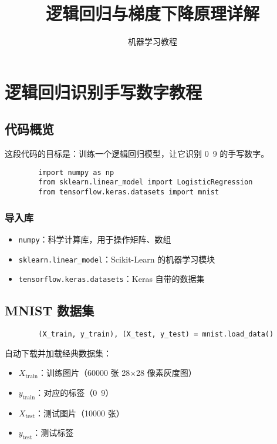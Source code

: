 \documentclass[UTF8]{ctexart}
\title{逻辑回归与梯度下降原理详解}
\author{机器学习教程}
\date{}
\begin{document}
	
	\maketitle
	
	\tableofcontents
	
	\section{逻辑回归识别手写数字教程}
	
	\subsection{代码概览}
	这段代码的目标是：训练一个逻辑回归模型，让它识别 0~9 的手写数字。
	
	\begin{lstlisting}
		import numpy as np
		from sklearn.linear_model import LogisticRegression
		from tensorflow.keras.datasets import mnist
	\end{lstlisting}
	
	\subsubsection{导入库}
	\begin{itemize}
		\item \texttt{numpy}：科学计算库，用于操作矩阵、数组
		\item \texttt{sklearn.linear\_model}：Scikit-Learn 的机器学习模块
		\item \texttt{tensorflow.keras.datasets}：Keras 自带的数据集
	\end{itemize}
	
	\subsection{MNIST 数据集}
	\begin{lstlisting}
		(X_train, y_train), (X_test, y_test) = mnist.load_data()
	\end{lstlisting}
	
	自动下载并加载经典数据集：
	\begin{itemize}
		\item $X_{\text{train}}$：训练图片（60000 张 28×28 像素灰度图）
		\item $y_{\text{train}}$：对应的标签（0~9）
		\item $X_{\text{test}}$：测试图片（10000 张）
		\item $y_{\text{test}}$：测试标签
	\end{itemize}
	
\end{document}
